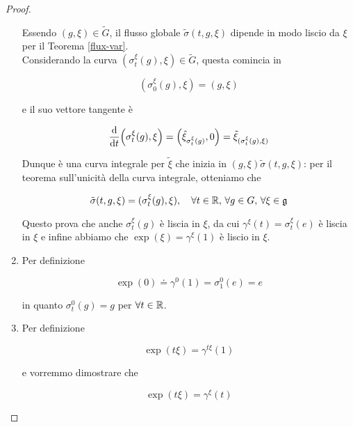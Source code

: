\begin{proof}
\begin{enumerate}
		Essendo $ (g,\xi) \in \tilde{G} $, il flusso globale $ \tilde{\sigma}(t,g,\xi) $ dipende in modo liscio da $ \xi $ per il Teorema \ref{flux-var}.\\
		Considerando la curva $ (\sigma_{t}^{\xi}(g),\xi) \in \tilde{G} $, questa comincia in
		
		\begin{equation}
			(\sigma_{0}^{\xi}(g),\xi) = (g,\xi)
		\end{equation}
	
		e il suo vettore tangente è
		
		\begin{equation}
			\dv{t} (\sigma_{t}^{\xi}(g),\xi) = \left( \hat{\xi}_{\sigma_{t}^{\xi}(g)}, 0 \right) = \tilde{\xi}_{(\sigma_{t}^{\xi}(g),\xi)}
		\end{equation}
	
		Dunque è una curva integrale per $ \tilde{\xi} $ che inizia in $ (g,\xi) $$ \tilde{\sigma}(t,g,\xi) $: per il teorema sull'unicità della curva integrale, otteniamo che
		
		\begin{equation}
			\tilde{\sigma}(t,g,\xi) = (\sigma_{t}^{\xi}(g),\xi) \qcomma \forall t \in \R, \, \forall g \in G, \, \forall \xi \in \g
		\end{equation}
	
		Questo prova che anche $ \sigma_{t}^{\xi}(g) $ è liscia in $ \xi $, da cui $ \gamma^{\xi}(t) = \sigma_{t}^{\xi}(e) $ è liscia in $ \xi $ e infine abbiamo che $ \exp(\xi) = \gamma^{\xi}(1) $ è liscio in $ \xi $.
		
		\item Per definizione
		
		\begin{equation}
			\exp(0) \doteq \gamma^{0}(1) = \sigma_{1}^{0}(e) = e
		\end{equation}
	
		in quanto $ \sigma_{t}^{0}(g) = g $ per $ \forall t \in \mathbb{R} $.
		
		\item Per definizione
		
		\begin{equation}
			\exp(t \xi) = \gamma^{t \xi}(1)
		\end{equation}
	
		e vorremmo dimostrare che
		
		\begin{equation}
			\exp(t \xi) = \gamma^{\xi}(t)
		\end{equation}
	

\end{enumerate}
\end{proof}
